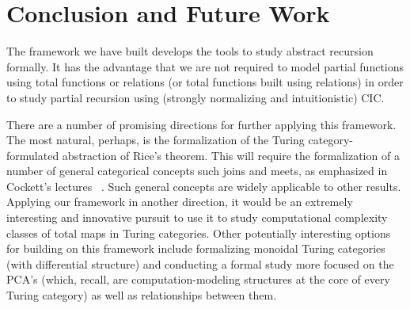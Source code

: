 \documentclass{entcs} \usepackage{entcsmacro}
\begin{document}
\section{Conclusion and Future Work}

The framework we have built develops the  tools to study
abstract recursion formally. It has the advantage that we are not
required to model partial functions using total functions or relations
(or total functions built using relations) in order to study partial
recursion using (strongly normalizing and intuitionistic) CIC.

There are a number of promising directions
for further applying this framework.  The most natural, perhaps, is
the formalization of the Turing category-formulated abstraction of
Rice's theorem.  This will require the formalization of a number of
general categorical concepts such joins and meets, as emphasized in
Cockett's lectures ~\cite{Estonia}.  Such general concepts are widely
applicable to other results.  Applying our framework in another
direction, it would be an extremely interesting and innovative pursuit
to use it to study computational complexity classes of total maps in
Turing categories. Other potentially interesting options for building
on this framework include formalizing monoidal Turing categories (with
differential structure) and conducting a formal study more focused on
the PCA's (which, recall, are computation-modeling structures at the
core of every Turing category) as well as relationships between them.








\end{document}
